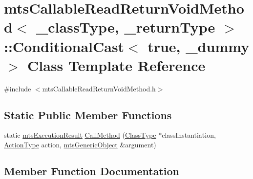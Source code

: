 \hypertarget{classmts_callable_read_return_void_method_1_1_conditional_cast_3_01true_00_01__dummy_01_4}{}\section{mts\+Callable\+Read\+Return\+Void\+Method$<$ \+\_\+class\+Type, \+\_\+return\+Type $>$\+:\+:Conditional\+Cast$<$ true, \+\_\+dummy $>$ Class Template Reference}
\label{classmts_callable_read_return_void_method_1_1_conditional_cast_3_01true_00_01__dummy_01_4}


{\ttfamily \#include $<$mts\+Callable\+Read\+Return\+Void\+Method.\+h$>$}

\subsection*{Static Public Member Functions}
\begin{DoxyCompactItemize}
\item 
static \hyperlink{classmts_execution_result}{mts\+Execution\+Result} \hyperlink{classmts_callable_read_return_void_method_1_1_conditional_cast_3_01true_00_01__dummy_01_4_ad25d200a48d40f9eeece2798b1435c54}{Call\+Method} (\hyperlink{classmts_callable_read_return_void_method_a694e26a4c7fc28f0c739aa2f2ab97e12}{Class\+Type} $\ast$class\+Instantiation, \hyperlink{classmts_callable_read_return_void_method_a97673cc9242251e406bde738cb060781}{Action\+Type} action, \hyperlink{classmts_generic_object}{mts\+Generic\+Object} \&argument)
\end{DoxyCompactItemize}


\subsection{Member Function Documentation}
\hypertarget{classmts_callable_read_return_void_method_1_1_conditional_cast_3_01true_00_01__dummy_01_4_ad25d200a48d40f9eeece2798b1435c54}{}
